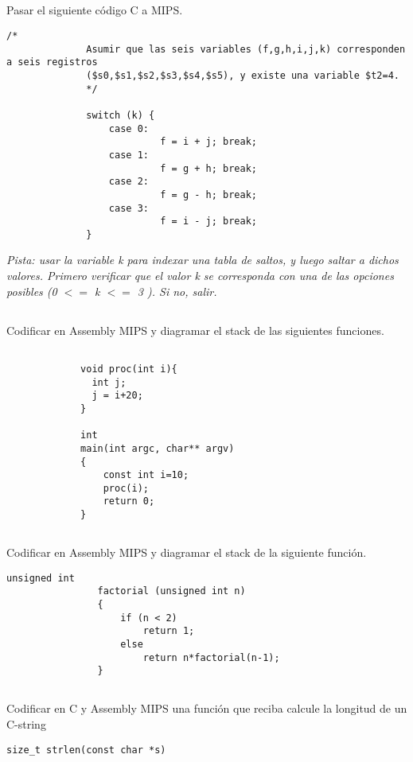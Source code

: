 \subsection{}
      Pasar el siguiente código C a MIPS.
      \begin{small}
          \begin{lstlisting}[style=6620C]
              /*
              Asumir que las seis variables (f,g,h,i,j,k) corresponden a seis registros 
              ($s0,$s1,$s2,$s3,$s4,$s5), y existe una variable $t2=4.
              */
               
              switch (k) {
                  case 0:
                           f = i + j; break; 
                  case 1:
                           f = g + h; break;
                  case 2:
                           f = g - h; break; 
                  case 3:
                           f = i - j; break; 
              }
          \end{lstlisting}
      \end{small}
      \textit{Pista: usar la variable k para indexar una tabla de saltos, y luego 
      saltar a dichos valores.
      Primero verificar que el valor k se corresponda con una de las opciones posibles
      (0 \(<=\) k \(<=\) 3 ). Si no, salir.}
     \vfill    

\subsection{}
     Codificar en Assembly MIPS y diagramar el stack de las siguientes funciones.
           \begin{small}
             \begin{lstlisting}[style=6620C]
             
             void proc(int i){
               int j;
               j = i+20; 
             } 

             int 
             main(int argc, char** argv)
             {
                 const int i=10; 
                 proc(i); 
                 return 0; 
             } 
           \end{lstlisting}
     \end{small}

\subsection{}
  Codificar en Assembly MIPS y diagramar el stack de la siguiente función.
		\begin{small}
			\begin{lstlisting}[style=6620C]
				unsigned int
				factorial (unsigned int n)
				{
				    if (n < 2)
				        return 1;
				    else 
				        return n*factorial(n-1);
				}
			\end{lstlisting}
		\end{small}

\subsection{}
  Codificar en C  y Assembly MIPS una función que reciba calcule la longitud de un C-string\\
  \begin{lstlisting}[style=6620C]
  size_t strlen(const char *s)
  \end{lstlisting}
